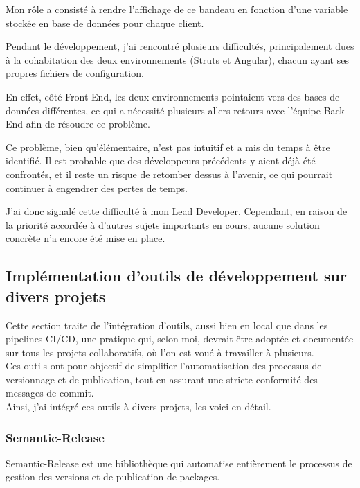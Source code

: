 \documentclass{article}
\begin{document}
Mon rôle a consisté à rendre l'affichage de ce bandeau en fonction d'une variable stockée en base de données pour chaque client.

Pendant le développement, j'ai rencontré plusieurs difficultés, principalement dues à la cohabitation des deux environnements (Struts et Angular), chacun ayant ses propres fichiers de configuration.

En effet, côté Front-End, les deux environnements pointaient vers des bases de données différentes, ce qui a nécessité plusieurs allers-retours avec l'équipe Back-End afin de résoudre ce problème.

Ce problème, bien qu'élémentaire, n'est pas intuitif et a mis du temps à être identifié. Il est probable que des développeurs précédents y aient déjà été confrontés, et il reste un risque de retomber dessus à l'avenir, ce qui pourrait continuer à engendrer des pertes de temps.

J'ai donc signalé cette difficulté à mon Lead Developer. Cependant, en raison de la priorité accordée à d'autres sujets importants en cours, aucune solution concrète n'a encore été mise en place.

\subsection{Implémentation d'outils de développement sur divers projets}

Cette section traite de l'intégration d'outils, aussi bien en local que dans les pipelines CI/CD, une pratique qui, selon moi, devrait être adoptée et documentée sur tous les projets collaboratifs, où l'on est voué à travailler à plusieurs. \\

Ces outils ont pour objectif de simplifier l'automatisation des processus de versionnage et de publication, tout en assurant une stricte conformité des messages de commit. \\

Ainsi, j'ai intégré ces outils à divers projets, les voici en détail.

\subsubsection{Semantic-Release}

Semantic-Release est une bibliothèque qui automatise entièrement le processus de gestion des versions et de publication de packages. \\
\end{document}
